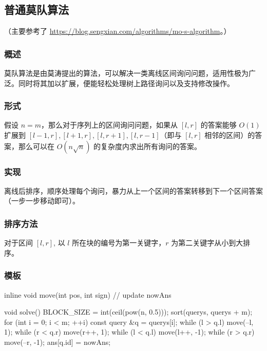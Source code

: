 
\subsection{普通莫队算法}

（主要参考了 \url{https://blog.sengxian.com/algorithms/mo-s-algorithm}。）

\subsubsection{概述}

莫队算法是由莫涛提出的算法，可以解决一类离线区间询问问题，适用性极为广泛。同时将其加以扩展，便能轻松处理树上路径询问以及支持修改操作。

\subsubsection{形式}

假设 $n=m$，那么对于序列上的区间询问问题，如果从 $[l,r]$ 的答案能够 $O(1)$ 扩展到 $[l-1,r],[l+1,r],[l,r+1],[l,r-1]$（即与 $[l,r]$ 相邻的区间）的答案，那么可以在 $O(n\sqrt{n})$ 的复杂度内求出所有询问的答案。

\subsubsection{实现}

离线后排序，顺序处理每个询问，暴力从上一个区间的答案转移到下一个区间答案（一步一步移动即可）。

\subsubsection{排序方法}

对于区间 $[l,r]$, 以 $l$ 所在块的编号为第一关键字，$r$ 为第二关键字从小到大排序。

\subsubsection{模板}

\begin{cppcode}
inline void move(int pos, int sign) {
  // update nowAns
}

void solve() {
  BLOCK_SIZE = int(ceil(pow(n, 0.5)));
  sort(querys, querys + m);
  for (int i = 0; i < m; ++i) {
    const query &q = querys[i];
    while (l > q.l) move(--l, 1);
    while (r < q.r) move(r++, 1);
    while (l < q.l) move(l++, -1);
    while (r > q.r) move(--r, -1);
    ans[q.id] = nowAns;
  }
}
\end{cppcode}

